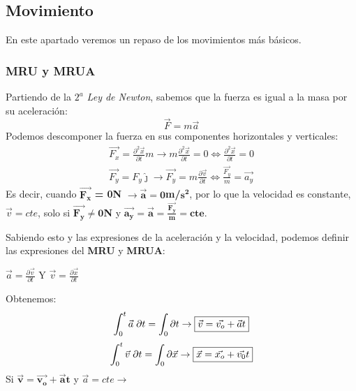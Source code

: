 \subsection{Movimiento}
 En este apartado veremos un repaso de los movimientos más básicos.


\subsubsection{MRU y MRUA}

 Partiendo de la \textit{\(2^a\) Ley de Newton}, sabemos que la fuerza es igual a la masa por su aceleración:
\[\vec{F} = m\vec{a}\]
Podemos descomponer la fuerza en sus componentes horizontales y verticales:
\begin{align*}
        \vec{F_{x}}=\frac{\partial^{2}\vec{x}}{\partial{t}}m
        \to
        m\frac{\partial^2 \vec{x}}{\partial t} = 0
        \Leftrightarrow
        \frac{\partial^2{\vec{x}}}{\partial{t}} = 0
        \\
        \vec{F_{y}}=F_{y}\hat{\jmath}
        \to
        \vec{F_y} = m\frac{\partial\vec{v}}{\partial t}\Leftrightarrow
        \frac{\vec{F_y}}{m} = \vec{a_y}
\end{align*}
Es decir, cuando \(\bm{\vec{F_x}}\)\textbf{ = 0N} \(\bm{\to\vec{a}=0}\)\textbf{m/}\(\bm{s^2}\), por lo que la velocidad es constante, \(\vec{v}=cte\), solo si \(\bm{\vec{F_y}\neq 0}\)\textbf{N} y \(\bm{\vec{a_y} = \vec{a} = \frac{\vec{F_y}}{m}=cte}\).\par \vspace{0.5cm}  Sabiendo esto y las expresiones de la aceleración y la velocidad, podemos definir las expresiones del \textbf{MRU} y \textbf{MRUA}: \par \vspace{0.5cm} \hspace{5cm}
\( \vec{a} = \frac{\partial \vec{v} }{\partial t}\) Y \( \vec{v} = \frac{\partial \vec{x} }{\partial t}\) \par \vspace{0.5cm} Obtenemos:
\[
        \int_{0}^{t}{\vec{a}\hspace{1mm}\partial{t}} = \int_{0}\partial{t}
        \to
        \boxed{\vec{v} = \vec{v_o} + \vec{a}t}
\]
\[
        \int_{0}^{t}{\vec{v}\hspace{1mm}\partial{t}} = \int_{0}{\partial{\vec{x}}}
        \to
        \boxed{\vec{x} = \vec{x_o} + \vec{v_0}t}
\]
\hspace{2.3cm} Si \( \bm{\vec{v} = \vec{v_o} + \vec{a}t}\)
y
\( \vec{a} = cte \to\) 
